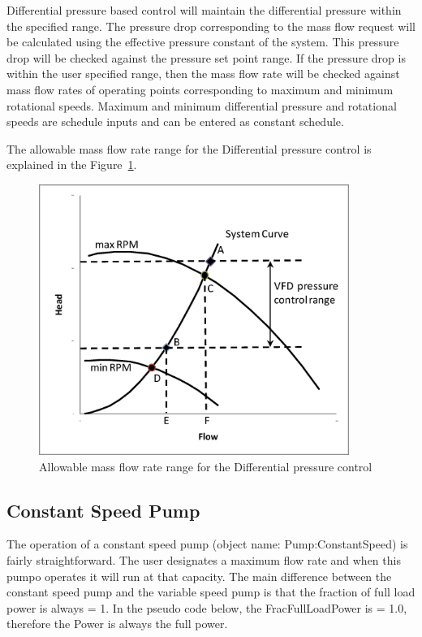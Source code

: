 Differential pressure based control will maintain the differential pressure within the specified range. The pressure drop corresponding to the mass flow request will be calculated using the effective pressure constant of the system. This pressure drop will be checked against the pressure set point range. If the pressure drop is within the user specified range, then the mass flow rate will be checked against mass flow rates of operating points corresponding to maximum and minimum rotational speeds. Maximum and minimum differential pressure and rotational speeds are schedule inputs and can be entered as constant schedule.

The allowable mass flow rate range for the Differential pressure control is explained in the Figure~\ref{fig:allowable-mass-flow-rate-range-for}.

\begin{figure}[hbtp] %
\centering
\includegraphics[width=0.9\textwidth, height=0.9\textheight, keepaspectratio=true]{media/image5856.png}
\caption{Allowable mass flow rate range for the Differential pressure control \protect \label{fig:allowable-mass-flow-rate-range-for}}
\end{figure}

\subsection{Constant Speed Pump}\label{constant-speed-pump}

The operation of a constant speed pump (object name: Pump:ConstantSpeed) is fairly straightforward. The user designates a maximum flow rate and when this pumpo operates it will run at that capacity. The main difference between the constant speed pump and the variable speed pump is that the fraction of full load power is always = 1. In the pseudo code below, the FracFullLoadPower is = 1.0, therefore the Power is always the full power.

